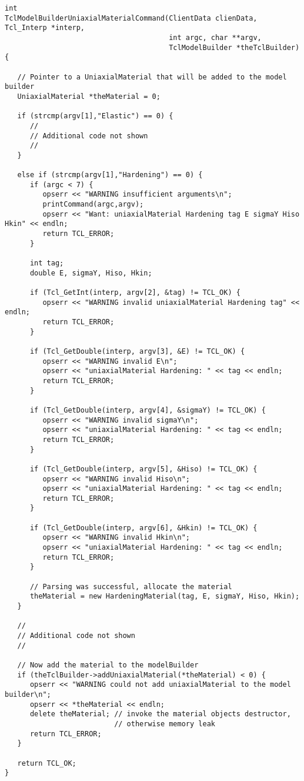 \documentclass[12pt]{article}
\begin{document}
{\sf\small
\begin{verbatim}
int
TclModelBuilderUniaxialMaterialCommand(ClientData clienData, Tcl_Interp *interp,
                                       int argc, char **argv,
                                       TclModelBuilder *theTclBuilder)
{

   // Pointer to a UniaxialMaterial that will be added to the model builder
   UniaxialMaterial *theMaterial = 0;

   if (strcmp(argv[1],"Elastic") == 0) {
      //
      // Additional code not shown
      //
   }

   else if (strcmp(argv[1],"Hardening") == 0) {
      if (argc < 7) {
         opserr << "WARNING insufficient arguments\n";
         printCommand(argc,argv);
         opserr << "Want: uniaxialMaterial Hardening tag E sigmaY Hiso Hkin" << endln;
         return TCL_ERROR;
      }

      int tag;
      double E, sigmaY, Hiso, Hkin;

      if (Tcl_GetInt(interp, argv[2], &tag) != TCL_OK) {
         opserr << "WARNING invalid uniaxialMaterial Hardening tag" << endln;
         return TCL_ERROR;		
      }

      if (Tcl_GetDouble(interp, argv[3], &E) != TCL_OK) {
         opserr << "WARNING invalid E\n";
         opserr << "uniaxialMaterial Hardening: " << tag << endln;
         return TCL_ERROR;	
      }

      if (Tcl_GetDouble(interp, argv[4], &sigmaY) != TCL_OK) {
         opserr << "WARNING invalid sigmaY\n";
         opserr << "uniaxialMaterial Hardening: " << tag << endln;
         return TCL_ERROR;
      }

      if (Tcl_GetDouble(interp, argv[5], &Hiso) != TCL_OK) {
         opserr << "WARNING invalid Hiso\n";
         opserr << "uniaxialMaterial Hardening: " << tag << endln;
         return TCL_ERROR;	
      }

      if (Tcl_GetDouble(interp, argv[6], &Hkin) != TCL_OK) {
         opserr << "WARNING invalid Hkin\n";
         opserr << "uniaxialMaterial Hardening: " << tag << endln;
         return TCL_ERROR;	
      }

      // Parsing was successful, allocate the material
      theMaterial = new HardeningMaterial(tag, E, sigmaY, Hiso, Hkin);       
   }

   //
   // Additional code not shown
   //

   // Now add the material to the modelBuilder
   if (theTclBuilder->addUniaxialMaterial(*theMaterial) < 0) {
      opserr << "WARNING could not add uniaxialMaterial to the model builder\n";
      opserr << *theMaterial << endln;
      delete theMaterial; // invoke the material objects destructor,
                          // otherwise memory leak
      return TCL_ERROR;
   }

   return TCL_OK;
}
\end{verbatim}
}
\end{document}
